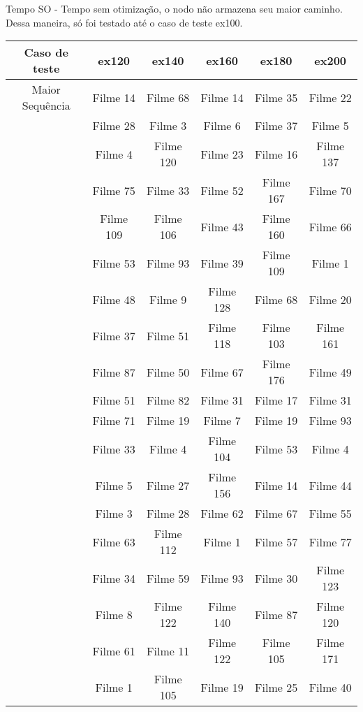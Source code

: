 \documentclass[12pt]{article}
\begin{document}
Tempo SO - Tempo sem otimização, o nodo não armazena seu maior caminho. Dessa maneira, só foi testado até o caso de teste ex100.

\begin{table}[H]

\centering

\begin{tabular}{|c|c|c|c|c|c|}

\hline
Caso de teste & ex120 & ex140 & ex160 & ex180 & ex200 \\
\hline
Maior Sequência & Filme 14 & Filme 68 & Filme 14 & Filme 35 & Filme 22 \\
\cline{2-6}
& Filme 28 & Filme 3 & Filme 6 &  Filme 37 & Filme 5 \\
\cline{2-6}
& Filme 4 & Filme 120 & Filme 23 & Filme 16 & Filme 137 \\
\cline{2-6}
& Filme 75 & Filme 33 & Filme 52 & Filme 167 & Filme 70 \\
\cline{2-6}
& Filme 109 & Filme 106 & Filme 43 & Filme 160 & Filme 66 \\
\cline{2-6}
& Filme 53 & Filme 93 & Filme 39 & Filme 109 & Filme 1 \\
\cline{2-6}
& Filme 48 & Filme 9 & Filme 128 & Filme 68 & Filme 20 \\
\cline{2-6}
& Filme 37 & Filme 51 & Filme 118 & Filme 103 & Filme 161 \\
\cline{2-6}
& Filme 87 & Filme 50 & Filme 67 & Filme 176 & Filme 49 \\
\cline{2-6}
& Filme 51 & Filme 82 & Filme 31 & Filme 17 & Filme 31 \\
\cline{2-6}
& Filme 71 & Filme 19 & Filme 7 & Filme 19 & Filme 93 \\
\cline{2-6}
& Filme 33 & Filme 4 & Filme 104 & Filme 53 & Filme 4 \\
\cline{2-6}
& Filme 5 & Filme 27 & Filme 156 & Filme 14 & Filme 44 \\
\cline{2-6}
& Filme 3 & Filme 28 & Filme 62 & Filme 67 & Filme 55 \\
\cline{2-6}
& Filme 63 & Filme 112 & Filme 1 & Filme 57 & Filme 77 \\
\cline{2-6}
& Filme 34 & Filme 59 & Filme 93 & Filme 30 & Filme 123 \\
\cline{2-6}
& Filme 8 & Filme 122 & Filme 140 & Filme 87 & Filme 120 \\
\cline{2-6}
& Filme 61 & Filme 11 & Filme 122 & Filme 105 & Filme 171 \\
\cline{2-6}
& Filme 1 & Filme 105 & Filme 19 & Filme 25 & Filme 40 \\

\end{tabular}
\end{table}
\end{document}

